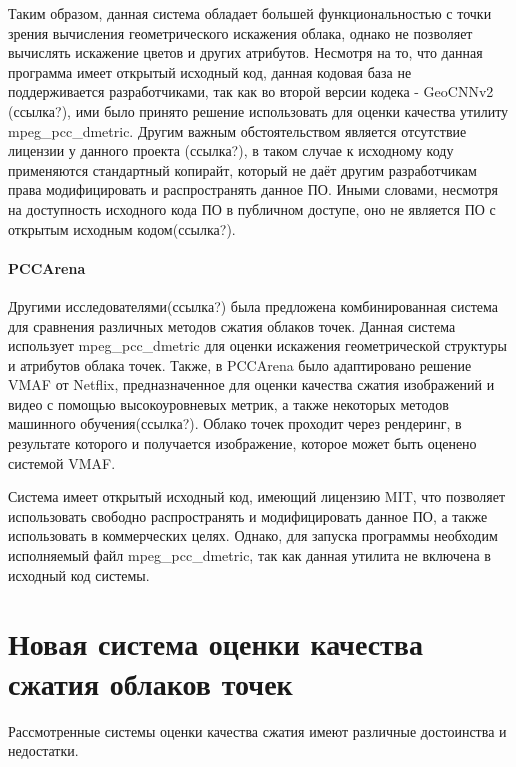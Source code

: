 Таким образом, данная система обладает большей функциональностью с точки зрения
вычисления геометрического искажения облака, однако не позволяет вычислять
искажение цветов и других атрибутов. Несмотря на то, что данная программа имеет
открытый исходный код, данная кодовая база не поддерживается разработчиками, так
как во второй версии кодека - GeoCNNv2 (ссылка?), ими было принято решение
использовать для оценки качества утилиту mpeg\_pcc\_dmetric. Другим важным
обстоятельством является отсутствие лицензии у данного проекта (ссылка?), в
таком случае к исходному коду применяются стандартный копирайт, который не даёт
другим разработчикам права модифицировать и распространять данное ПО. Иными
словами, несмотря на доступность исходного кода ПО в публичном доступе, оно не
является ПО с открытым исходным кодом(ссылка?).

\paragraph{PCCArena}

Другими исследователями(ссылка?) была предложена комбинированная система для
сравнения различных методов сжатия облаков точек. Данная система использует
mpeg\_pcc\_dmetric для оценки искажения геометрической структуры и атрибутов
облака точек. Также, в PCCArena было адаптировано решение VMAF от Netflix,
предназначенное для оценки качества сжатия изображений и видео с помощью
высокоуровневых метрик, а также некоторых методов машинного обучения(ссылка?).
Облако точек проходит через рендеринг, в результате которого и получается
изображение, которое может быть оценено системой VMAF.

Система имеет открытый исходный код, имеющий лицензию MIT, что позволяет
использовать свободно распространять и модифицировать данное ПО, а также
использовать в коммерческих целях. Однако, для запуска программы необходим
исполняемый файл mpeg\_pcc\_dmetric, так как данная утилита не включена в
исходный код системы.

\section{Новая система оценки качества сжатия облаков точек}

Рассмотренные системы оценки качества сжатия имеют различные достоинства и
недостатки.


